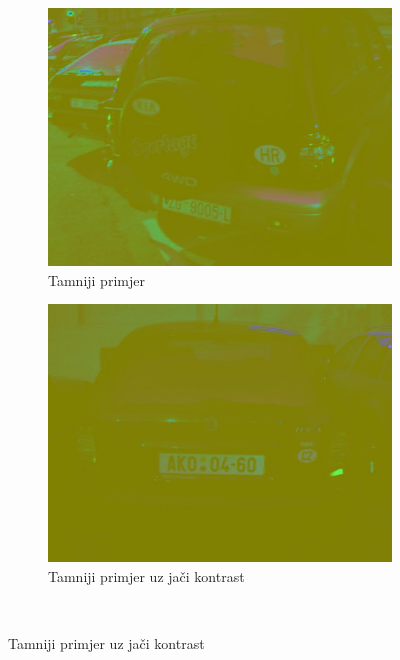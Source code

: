 \documentclass[times, utf8, diplomski]{fer}
\begin{document}
\begin{figure}[H]
     \centering
     \begin{subfigure}[b]{0.4\textwidth}
         \centering
         \includegraphics[width=\textwidth]{figures/ce_examples/1/ycrcb.jpg}
         \caption{Tamniji primjer}
     \end{subfigure}
     \hspace{1cm}
     \begin{subfigure}[b]{0.4\textwidth}
         \centering
         \includegraphics[width=\textwidth]{figures/ce_examples/2/ycrcb.jpg}
         \caption{Tamniji primjer uz jači kontrast}
     \end{subfigure}\\[0.5cm]

\end{figure}
\end{document}
